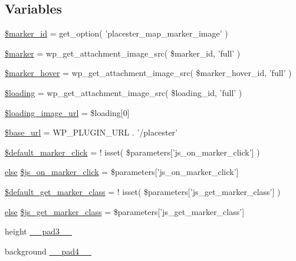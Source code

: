 \subsection*{Variables}
\begin{DoxyCompactItemize}
\item 
\hyperlink{listings__map_8php_ad29cb68cefe003634769eae00fd26916}{\$marker\_\-id} = get\_\-option( 'placester\_\-map\_\-marker\_\-image' )
\item 
\hyperlink{listings__map_8php_aad34fbf53cda6bd8a3a9c46764d534fa}{\$marker} = wp\_\-get\_\-attachment\_\-image\_\-src( \$marker\_\-id, 'full' )
\item 
\hyperlink{listings__map_8php_a85d5b478615ed4d6ab296cabe25e9ae4}{\$marker\_\-hover} = wp\_\-get\_\-attachment\_\-image\_\-src( \$marker\_\-hover\_\-id, 'full' )
\item 
\hyperlink{listings__map_8php_a27ac4b0f07ef94fb719218ae92868fd0}{\$loading} = wp\_\-get\_\-attachment\_\-image\_\-src( \$loading\_\-id, 'full' )
\item 
\hyperlink{listings__map_8php_ae1ffefca54b4e8c17826b7b3cce5ffd8}{\$loading\_\-image\_\-url} = \$loading\mbox{[}0\mbox{]}
\item 
\hyperlink{listings__map_8php_a6886427c9c643f707fcb35c018049bc7}{\$base\_\-url} = WP\_\-PLUGIN\_\-URL . '/placester'
\item 
\hyperlink{listings__map_8php_a1358e3da1e02e91db10e61ba8e17832c}{\$default\_\-marker\_\-click} = ! isset( \$parameters\mbox{[}'js\_\-on\_\-marker\_\-click'\mbox{]} )
\item 
\hyperlink{listings__list__of__map_8php_a0544c3fe466e421738dae463968b70ba}{else} \hyperlink{listings__map_8php_a7d77c6d941846766eabadb49334aff69}{\$js\_\-on\_\-marker\_\-click} = \$parameters\mbox{[}'js\_\-on\_\-marker\_\-click'\mbox{]}
\item 
\hyperlink{listings__map_8php_a6a64d265b170f571e9a7b8dd6c125991}{\$default\_\-get\_\-marker\_\-class} = ! isset( \$parameters\mbox{[}'js\_\-get\_\-marker\_\-class'\mbox{]} )
\item 
\hyperlink{listings__list__of__map_8php_a0544c3fe466e421738dae463968b70ba}{else} \hyperlink{listings__map_8php_a9b99c2d59610fff900adbf713b636026}{\$js\_\-get\_\-marker\_\-class} = \$parameters\mbox{[}'js\_\-get\_\-marker\_\-class'\mbox{]}
\item 
height \hyperlink{listings__map_8php_a2ea3cef4643b89d8260257f4d17eede9}{\_\-\_\-pad3\_\-\_\-}
\item 
background \hyperlink{listings__map_8php_a8278785471b941afcceb629250027091}{\_\-\_\-pad4\_\-\_\-}

\end{DoxyCompactItemize}
